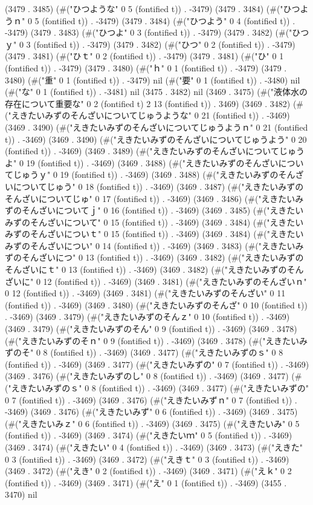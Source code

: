 (3479 . 3485) (#("ひつような" 0 5 (fontified t)) . -3479) (3479 . 3484) (#("ひつようｎ" 0 5 (fontified t)) . -3479) (3479 . 3484) (#("ひつよう" 0 4 (fontified t)) . -3479) (3479 . 3483) (#("ひつよ" 0 3 (fontified t)) . -3479) (3479 . 3482) (#("ひつｙ" 0 3 (fontified t)) . -3479) (3479 . 3482) (#("ひつ" 0 2 (fontified t)) . -3479) (3479 . 3481) (#("ひｔ" 0 2 (fontified t)) . -3479) (3479 . 3481) (#("ひ" 0 1 (fontified t)) . -3479) (3479 . 3480) (#("ｈ" 0 1 (fontified t)) . -3479) (3479 . 3480) (#("重" 0 1 (fontified t)) . -3479) nil (#("要" 0 1 (fontified t)) . -3480) nil (#("な" 0 1 (fontified t)) . -3481) nil (3475 . 3482) nil (3469 . 3475) (#("液体水の存在について重要な" 0 2 (fontified t) 2 13 (fontified t)) . 3469) (3469 . 3482) (#("えきたいみずのそんざいについてじゅうような" 0 21 (fontified t)) . -3469) (3469 . 3490) (#("えきたいみずのそんざいについてじゅうようｎ" 0 21 (fontified t)) . -3469) (3469 . 3490) (#("えきたいみずのそんざいについてじゅうよう" 0 20 (fontified t)) . -3469) (3469 . 3489) (#("えきたいみずのそんざいについてじゅうよ" 0 19 (fontified t)) . -3469) (3469 . 3488) (#("えきたいみずのそんざいについてじゅうｙ" 0 19 (fontified t)) . -3469) (3469 . 3488) (#("えきたいみずのそんざいについてじゅう" 0 18 (fontified t)) . -3469) (3469 . 3487) (#("えきたいみずのそんざいについてじゅ" 0 17 (fontified t)) . -3469) (3469 . 3486) (#("えきたいみずのそんざいについてｊ" 0 16 (fontified t)) . -3469) (3469 . 3485) (#("えきたいみずのそんざいについて" 0 15 (fontified t)) . -3469) (3469 . 3484) (#("えきたいみずのそんざいについｔ" 0 15 (fontified t)) . -3469) (3469 . 3484) (#("えきたいみずのそんざいについ" 0 14 (fontified t)) . -3469) (3469 . 3483) (#("えきたいみずのそんざいにつ" 0 13 (fontified t)) . -3469) (3469 . 3482) (#("えきたいみずのそんざいにｔ" 0 13 (fontified t)) . -3469) (3469 . 3482) (#("えきたいみずのそんざいに" 0 12 (fontified t)) . -3469) (3469 . 3481) (#("えきたいみずのそんざいｎ" 0 12 (fontified t)) . -3469) (3469 . 3481) (#("えきたいみずのそんざい" 0 11 (fontified t)) . -3469) (3469 . 3480) (#("えきたいみずのそんざ" 0 10 (fontified t)) . -3469) (3469 . 3479) (#("えきたいみずのそんｚ" 0 10 (fontified t)) . -3469) (3469 . 3479) (#("えきたいみずのそん" 0 9 (fontified t)) . -3469) (3469 . 3478) (#("えきたいみずのそｎ" 0 9 (fontified t)) . -3469) (3469 . 3478) (#("えきたいみずのそ" 0 8 (fontified t)) . -3469) (3469 . 3477) (#("えきたいみずのｓ" 0 8 (fontified t)) . -3469) (3469 . 3477) (#("えきたいみずの" 0 7 (fontified t)) . -3469) (3469 . 3476) (#("えきたいみずのし" 0 8 (fontified t)) . -3469) (3469 . 3477) (#("えきたいみずのｓ" 0 8 (fontified t)) . -3469) (3469 . 3477) (#("えきたいみずの" 0 7 (fontified t)) . -3469) (3469 . 3476) (#("えきたいみずｎ" 0 7 (fontified t)) . -3469) (3469 . 3476) (#("えきたいみず" 0 6 (fontified t)) . -3469) (3469 . 3475) (#("えきたいみｚ" 0 6 (fontified t)) . -3469) (3469 . 3475) (#("えきたいみ" 0 5 (fontified t)) . -3469) (3469 . 3474) (#("えきたいｍ" 0 5 (fontified t)) . -3469) (3469 . 3474) (#("えきたい" 0 4 (fontified t)) . -3469) (3469 . 3473) (#("えきた" 0 3 (fontified t)) . -3469) (3469 . 3472) (#("えきｔ" 0 3 (fontified t)) . -3469) (3469 . 3472) (#("えき" 0 2 (fontified t)) . -3469) (3469 . 3471) (#("えｋ" 0 2 (fontified t)) . -3469) (3469 . 3471) (#("え" 0 1 (fontified t)) . -3469) (3455 . 3470) nil 